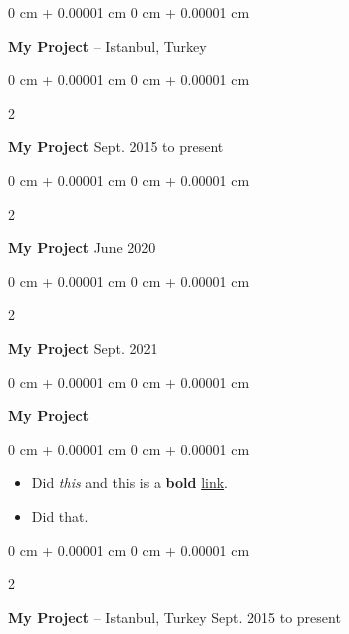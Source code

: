 \documentclass[10pt, letterpaper]{article}
\newenvironment{highlights}{
    \begin{itemize}[
        topsep=0.10 cm,
        parsep=0.10 cm,
        partopsep=0pt,
        itemsep=0pt,
        leftmargin=0 cm + 10pt
    ]
}{
    \end{itemize}
} %
\newenvironment{onecolentry}{
    \begin{adjustwidth}{
        0 cm + 0.00001 cm
    }{
        0 cm + 0.00001 cm
    }
}{
    \end{adjustwidth}
} %
\newenvironment{twocolentry}[2][]{
    \onecolentry
    \def\secondColumn{#2}
    \setcolumnwidth{\fill, 4.5 cm}
    \begin{paracol}{2}
}{
    \switchcolumn \raggedleft \secondColumn
    \end{paracol}
    \endonecolentry
} %
\begin{document}
        \begin{onecolentry}
            \textbf{My Project} -- Istanbul, Turkey\end{onecolentry}



        \vspace{0.2 cm}

        \begin{twocolentry}{
            Sept. 2015 to present
        }
            \textbf{My Project}\end{twocolentry}



        \vspace{0.2 cm}

        \begin{twocolentry}{
            June 2020
        }
            \textbf{My Project}\end{twocolentry}



        \vspace{0.2 cm}

        \begin{twocolentry}{
            Sept. 2021
        }
            \textbf{My Project}\end{twocolentry}



        \vspace{0.2 cm}

        \begin{onecolentry}
            \textbf{My Project}\end{onecolentry}

        \vspace{0.10 cm}
        \begin{onecolentry}
            \begin{highlights}
                \item Did \textit{this} and this is a \textbf{bold} \href{https://example.com}{link}.
                \item Did that.
            \end{highlights}
        \end{onecolentry}


        \vspace{0.2 cm}

        \begin{twocolentry}{
            Sept. 2015 to present
        }
            \textbf{My Project} -- Istanbul, Turkey\end{twocolentry}
\end{document}
